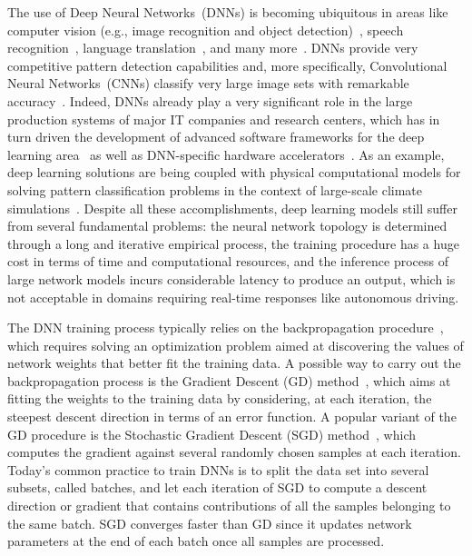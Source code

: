 The use of Deep Neural Networks~(DNNs) is becoming ubiquitous 
in areas like computer vision (e.g., image recognition and object detection)~\cite{alexnet, Inception}, speech recognition~\cite{Acoustic}, language translation~\cite{Language}, and many more~\cite{Ciregan2012}. 
DNNs provide very competitive pattern detection capabilities and, more specifically, Convolutional Neural Networks~(CNNs) classify very large image sets with remarkable accuracy~\cite{Krizhevsky2012}.
Indeed, DNNs already play a very significant role in the large production systems of major IT companies and research centers, which has in turn driven the development of advanced software frameworks for the deep learning area~\cite{tensorflow} as well as DNN-specific hardware accelerators~\cite{Merolla668,Jouppi2017}. 
As an example, deep learning solutions are being coupled with physical computational models  for solving pattern classification problems in the context of large-scale climate simulations~\cite{Kurth2017}.
Despite all these accomplishments, deep learning models still suffer from several fundamental problems: the neural network topology is determined through a long and iterative empirical process, the training procedure has a huge cost in terms of time and computational resources, and the inference process of large network models incurs considerable latency to produce an output, which is not acceptable in domains requiring real-time responses like autonomous driving.

The DNN training process typically relies on the backpropagation 
procedure~\cite{Werbos74}, which requires solving an optimization problem 
aimed at discovering the values of network weights that better fit the training data.
A possible way to carry out the backpropagation process is the Gradient Descent 
(GD) method~\cite{Press88}, which aims at fitting the weights to the training data by considering, at each iteration, the steepest descent direction in terms of an error function. 
A popular variant of the GD procedure is the Stochastic Gradient Descent 
(SGD) method~\cite{KieferWolfowitz1952}, which computes the gradient against several randomly chosen samples at each iteration. 
Today's common practice to train DNNs is to split the data set into several subsets, called batches, and let each iteration of SGD to compute a descent direction or gradient that contains contributions of all the samples belonging to the same batch.
SGD converges faster than GD since it updates network parameters at the end of each batch once all samples are processed.

